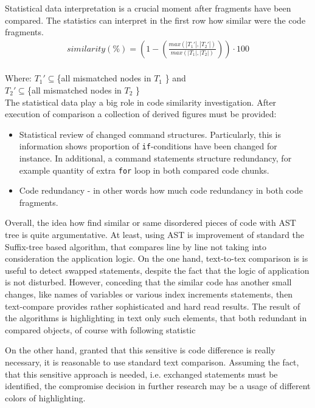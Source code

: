 \documentclass{report}
\begin{document}
Statistical data interpretation is a crucial moment after fragments have been compared. The statistics can interpret in the first row how similar were the code fragments. \\
\begin{gather*}
similarity(\%) =  \left ( 1 - \left (\frac{max(|T_{1}'|, |T_{2}'|)}{max(|T_{1}|, |T_{2}|)} \right ) \right )\cdot 100 
\end{gather*} \\
Where: $T_{1}' \subseteq $\{all mismatched nodes in $T_{1}$ \} and \\$T_{2}' \subseteq $\{all mismatched nodes in $T_{2}$ \}
\\
The statistical data play a big role in code similarity investigation. After execution of comparison a collection of derived figures must be provided:
\begin{itemize}
	\item Statistical review of changed command structures. Particularly, this is information shows proportion of \texttt{if}-conditions have been changed for instance. In additional, a command statements structure redundancy, for example quantity of extra \texttt{for} loop in both compared code chunks.
	\item Code redundancy - in other words how much code redundancy in both code fragments.
\end{itemize}
Overall, the idea how find similar or same disordered pieces of code with AST tree is quite argumentative. At least, using AST is improvement of standard the Suffix-tree based algorithm, that compares line by line not taking into consideration the application logic. On the one hand, text-to-tex comparison is is useful to detect swapped statements, despite the fact that the logic of application is not disturbed. 
However, conceding that the similar code has another small changes, like names of variables or various index increments statements, then text-compare provides rather sophisticated and hard read results. The result of the algorithms is highlighting in text only such elements, that both redundant in compared objects, of course with following statistic

On the other hand, granted that this sensitive is code difference is really necessary, it is reasonable to use standard text comparison. Assuming the fact, that this sensitive approach is needed, i.e. exchanged statements must be identified, the compromise decision in further research  may be a usage of different colors of highlighting.
\end{document}
